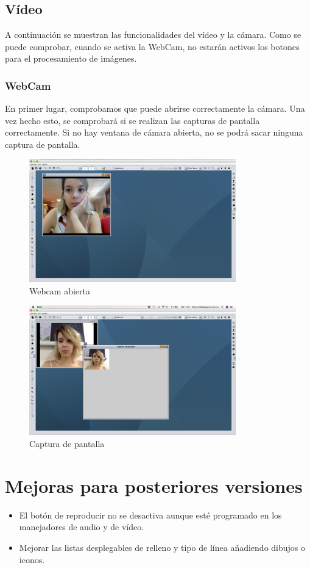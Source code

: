\subsection{Vídeo}
A continuación se muestran las funcionalidades del vídeo y la cámara. Como se puede comprobar, cuando se activa la WebCam, no estarán activos los botones para el procesamiento de imágenes.
\subsubsection{WebCam}
En primer lugar, comprobamos que puede abrirse correctamente la cámara. Una vez hecho esto, se comprobará si se realizan las capturas de pantalla correctamente. Si no hay ventana de cámara abierta, no se podrá sacar ninguna captura de pantalla.
\vskip0.3cm
\begin{figure}[H]
 \centering
  \includegraphics[width=0.8\textwidth]{video/webcam.jpg}
 \caption{Webcam abierta}
 \label{diseño}
 \end{figure}
 \vskip0.3cm
\begin{figure}[H]
 \centering
  \includegraphics[width=0.8\textwidth]{video/captura.jpg}
 \caption{Captura de pantalla}
 \label{diseño}
 \end{figure}
 
\section{Mejoras para posteriores versiones}
\begin{itemize}
\item{El botón de reproducir no se desactiva aunque esté programado en los manejadores de audio y de vídeo.}
\item{Mejorar las listas desplegables de relleno y tipo de línea añadiendo dibujos o iconos.}
\end{itemize}


